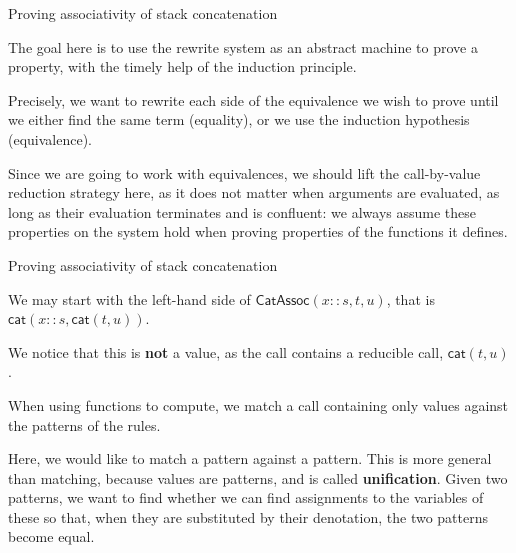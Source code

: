 \documentclass[compress,dvipdfmx]{beamer}
\newcommand\fun[1]{\textsf{#1}}
\newcommand\cons[2]{{#1}\!::\!{#2}}
\newcommand\predName[1]{\textsf{#1}}
\newcommand\pred[2]{\predName{#1}({#2})}
\begin{document}
%
\begin{frame}{Proving associativity of stack concatenation}

  The goal here is to use the rewrite system as an abstract machine to
  prove a property, with the timely help of the induction principle.

  \bigskip

  Precisely, we want to rewrite each side of the equivalence we wish
  to prove until we either find the same term (equality), or we use
  the induction hypothesis (equivalence).

  \bigskip

  Since we are going to work with equivalences, we should lift the
  call\hyp{}by\hyp{}value reduction strategy here, as it does not
  matter when arguments are evaluated, as long as their evaluation
  terminates and is confluent: we always assume these properties on
  the system hold when proving properties of the functions it defines.

\end{frame}

%
\begin{frame}{Proving associativity of stack concatenation}

  We may start with the left\hyp{}hand side of
  \(\pred{CatAssoc}{\cons{x}{s},t,u}\), that is
  \(\fun{cat}(\cons{x}{s},\fun{cat}(t,u))\).

  \bigskip

  We notice that this is \textbf{not} a value, as the call contains a
  reducible call, \(\fun{cat}(t,u)\).

  \bigskip

  When using functions to compute, we match a call containing only
  values against the patterns of the rules.

  \bigskip

  Here, we would like to match a pattern against a pattern. This is
  more general than matching, because values are patterns, and is
  called \textbf{unification}. Given two patterns, we want to find
  whether we can find assignments to the variables of these so that,
  when they are substituted by their denotation, the two patterns
  become equal.

\end{frame}
\end{document}
